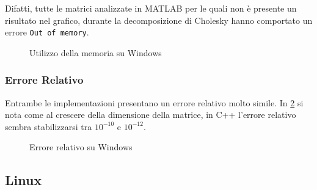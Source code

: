 \documentclass[11pt,italian]{article}
\begin{document}
Difatti, tutte le matrici analizzate in MATLAB per le quali non è presente un risultato nel grafico, durante la decomposizione di Cholesky hanno comportato un errore \lstinline{Out of memory}.
\begin{figure}[H]
    \caption{Utilizzo della memoria su Windows}
    \label{fig:windows-memory}
\end{figure}

\smallskip
\subsubsection*{Errore Relativo}
Entrambe le implementazioni presentano un errore relativo molto simile.
In \cref{fig:windows-error} si nota come al crescere della dimensione della matrice, in C++ l'errore relativo sembra stabilizzarsi tra $10^{-10}$ e $10^{-12}$.
\begin{figure}[H]
    \caption{Errore relativo su Windows}
    \label{fig:windows-error}
\end{figure}

\subsection{Linux}
\end{document}
